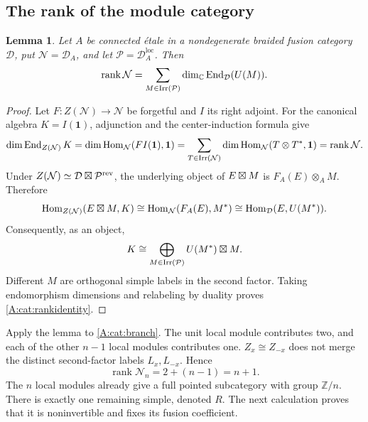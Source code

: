 \documentclass[11pt]{article}
\newtheorem{lemma}[theorem]{Lemma}
\newcommand{\C}{\mathbb C}\newcommand{\Q}{\mathbb Q}\newcommand{\Z}{\mathbb Z}
\newcommand{\one}{\mathbf1}\newcommand{\D}{\mathcal D}\newcommand{\Dcat}{\mathcal D}
\newcommand{\Ncat}{\mathcal N}\newcommand{\Pcat}{\mathcal P}\newcommand{\Fcat}{\mathcal F}
\newcommand{\rank}{\operatorname{rank}}\newcommand{\End}{\operatorname{End}}
\newcommand{\Hom}{\operatorname{Hom}}\newcommand{\id}{\operatorname{id}}
\numberwithin{equation}{section}
\begin{document}
\subsection{The rank of the module category}
\begin{lemma}\label{A:cat:ranklemma}
Let $A$ be connected \'etale in a nondegenerate braided fusion category $\D$, put $\Ncat=\D_A$, and let $\Pcat=\D_A^{\mathrm{loc}}$. Then
\begin{equation}\label{A:cat:rankidentity}
 \rank\Ncat=\sum_{M\in\Irr(\Pcat)}\dim_{\C}\End_{\D}(U(M)).
\end{equation}
\end{lemma}
\begin{proof}
Let $F:Z(\Ncat)\to\Ncat$ be forgetful and $I$ its right adjoint. For the canonical algebra $K=I(\one)$, adjunction and the center-induction formula \cite[Proposition 9.2.2]{A:EGNO} give
\[
 \dim\End_{Z(\Ncat)}K=\dim\Hom_{\Ncat}(F I(\one),\one)
 =\sum_{T\in\Irr(\Ncat)}\dim\Hom_{\Ncat}(T\otimes T^*,\one)
 =\rank\Ncat.
\]
Under $Z(\Ncat)\simeq\D\bo\Pcat^{\mathrm{rev}}$, the underlying object of $E\boxtimes M$ is $F_A(E)\otimes_A M$. Therefore
\[
 \Hom_{Z(\Ncat)}(E\bo M,K)
 \cong\Hom_{\Ncat}(F_A(E),M^*)
 \cong\Hom_{\D}(E,U(M^*)).
\]
Consequently, as an object,
\[
 K\cong\bigoplus_{M\in\Irr(\Pcat)}U(M^*)\bo M.
\]
Different $M$ are orthogonal simple labels in the second factor. Taking endomorphism dimensions and relabeling by duality proves \eqref{A:cat:rankidentity}.
\end{proof}

Apply the lemma to \eqref{A:cat:branch}. The unit local module contributes two, and each of the other $n-1$ local modules contributes one. $Z_x\cong Z_{-x}$ does not merge the distinct second-factor labels $L_x,L_{-x}$. Hence
\begin{equation}\label{A:cat:rankN}
 \rank\Ncat_n=2+(n-1)=n+1.
\end{equation}
The $n$ local modules already give a full pointed subcategory with group $\Z/n$. There is exactly one remaining simple, denoted $R$. The next calculation proves that it is noninvertible and fixes its fusion coefficient.
\end{document}
